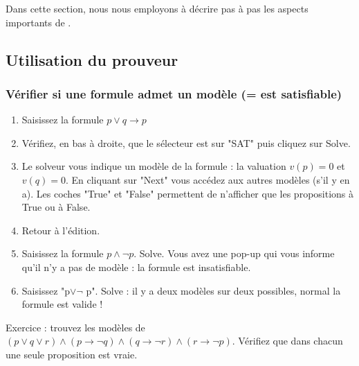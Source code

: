 

Dans cette section, nous nous employons à décrire pas à pas les aspects importants de \touist.

\subsection{Utilisation du prouveur}
\subsubsection{Vérifier si une formule admet un modèle (= est satisfiable)}
\begin{enumerate}
\item Saisissez la formule $p\vee q\rightarrow p$
\item Vérifiez, en bas à droite, que le sélecteur est sur "SAT" puis cliquez sur Solve.
\item Le solveur vous indique un modèle de la formule : la valuation $v(p)=0$ et $v(q)=0$. En cliquant sur "Next" vous accédez aux autres modèles (s'il y en a). Les coches "True" et "False" permettent de n'afficher que les propositions à True ou à False. 
\item Retour à l'édition.
\item Saisissez la formule $p\wedge\neg p$. Solve. Vous avez une pop-up qui vous informe qu'il n'y a pas de modèle : la formule est insatisfiable. 
\item Saisissez "p$\vee \neg$ p". Solve : il y a deux modèles sur deux possibles, normal la formule est valide !
\end{enumerate}
Exercice : trouvez les modèles de $(p \vee q \vee r) \wedge (p \rightarrow \neg q) \wedge (q \rightarrow \neg r) \wedge (r\rightarrow \neg p)$. Vérifiez que dans chacun une seule proposition est vraie. 

